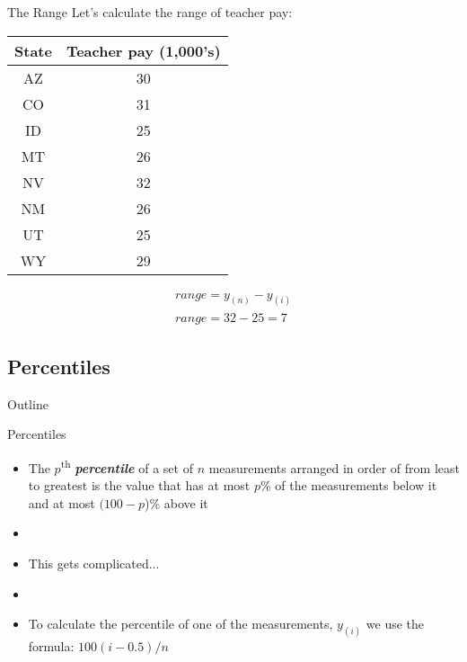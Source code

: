 \documentclass[xcolor=dvipsnames]{beamer}
\begin{document}
\begin{frame}{The Range}
Let's calculate the range of teacher pay:
	\begin{center}
		\begin{tabular}{|c|c|}
			\hline 
			\textbf{State} & \textbf{Teacher pay (1,000's)} \\ 
			\hline \hline
			AZ & 30 \\ \hline 
			CO &  31 \\ \hline 
			ID & 25  \\  \hline 
			MT &  26 \\ \hline 
			NV & 32 \\ \hline 
			NM &  26 \\ \hline 
			UT &  25 \\ \hline 
			WY &  29 \\ \hline 
		\end{tabular} 
	\end{center}
	\begin{gather*}
		range = y_{(n)} - y_{(i)} \\
		range = 32 - 25 = 7
	\end{gather*}
\end{frame}

\subsection{Percentiles}
\begin{frame}{Outline}
	\tableofcontents[currentsection,subsectionstyle=show/shaded/hide]
\end{frame}

\begin{frame}{Percentiles}
	\begin{itemize}
		\item The $p$\textsuperscript{th} \textbf{\emph{percentile}} of a set of $n$ measurements arranged in order of from least to greatest is the value that has at most $p$\% of the measurements below it and at most $(100 - p$)\% above it \pause
		\item[]
		\item This gets complicated... \pause
		\item[]
		\item To calculate the percentile of one of the measurements, $y_{(i)}$ we use the formula: $100(i - 0.5)/n$
	\end{itemize}
\end{frame}
\end{document}
